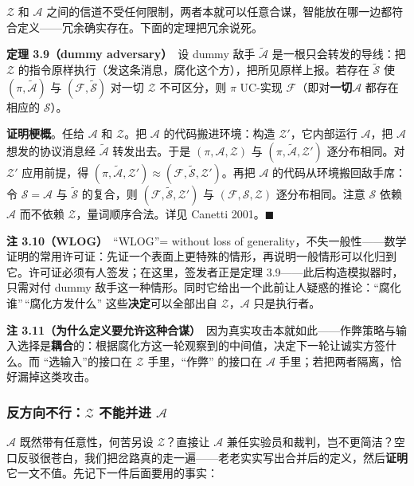 $\mathcal{Z}$ 和 $\mathcal{A}$ 之间的信道不受任何限制，两者本就可以任意合谋，智能放在哪一边都符合定义------冗余确实存在。下面的定理把冗余说死。

\textbf{定理 3.9（dummy adversary）}　设 dummy
敌手 $\tilde{\mathcal{A}}$ 是一根只会转发的导线：把 $\mathcal{Z}$ 的指令原样执行（发这条消息，腐化这个方），把所见原样上报。若存在 $\tilde{\mathcal{S}}$ 使 $(\pi, \tilde{\mathcal{A}})$ 与 $(\mathcal{F}, \tilde{\mathcal{S}})$ 对一切 $\mathcal{Z}$ 不可区分，则 $\pi$ UC-实现 $\mathcal{F}$（即对\textbf{一切}$\mathcal{A}$ 都存在相应的 $\mathcal{S}$）。

\textbf{证明梗概}。任给 $\mathcal{A}$ 和 $\mathcal{Z}$。把 $\mathcal{A}$ 的代码搬进环境：构造 $\mathcal{Z}'$，它内部运行 $\mathcal{A}$，把 $\mathcal{A}$ 想发的协议消息经 $\tilde{\mathcal{A}}$ 转发出去。于是 $(\pi, \mathcal{A}, \mathcal{Z})$ 与 $(\pi, \tilde{\mathcal{A}}, \mathcal{Z}')$ 逐分布相同。对 $\mathcal{Z}'$ 应用前提，得 $(\pi, \tilde{\mathcal{A}}, \mathcal{Z}') \approx (\mathcal{F}, \tilde{\mathcal{S}}, \mathcal{Z}')$。再把 $\mathcal{A}$ 的代码从环境搬回敌手席：令 $\mathcal{S} = \mathcal{A}$ 与 $\tilde{\mathcal{S}}$ 的复合，则 $(\mathcal{F}, \tilde{\mathcal{S}}, \mathcal{Z}')$ 与 $(\mathcal{F}, \mathcal{S}, \mathcal{Z})$ 逐分布相同。注意 $\mathcal{S}$ 依赖 $\mathcal{A}$ 而不依赖 $\mathcal{Z}$，量词顺序合法。详见
Canetti 2001。$\blacksquare$

\textbf{注 3.10（WLOG）}　“WLOG”= without loss of
generality，不失一般性------数学证明的常用许可证：先证一个表面上更特殊的情形，再说明一般情形可以化归到它。许可证必须有人签发；在这里，签发者正是定理
3.9------此后构造模拟器时，只需对付 dummy
敌手这一种情形。同时它给出一个此前让人疑惑的推论：“腐化谁”\,“腐化方发什么”
这些\textbf{决定}可以全部出自 $\mathcal{Z}$，$\mathcal{A}$ 只是执行者。

\textbf{注
3.11（为什么定义要允许这种合谋）}　因为真实攻击本就如此------作弊策略与输入选择是\textbf{耦合}的：根据腐化方这一轮观察到的中间值，决定下一轮让诚实方签什么。而
“选输入”的接口在 $\mathcal{Z}$ 手里，“作弊”
的接口在 $\mathcal{A}$ 手里；若把两者隔离，恰好漏掉这类攻击。

\subsubsection{\texorpdfstring{反方向不行：$\mathcal{Z}$ 不能并进 $\mathcal{A}$}{反方向不行：\textbackslash mathcal\{Z\}不能并进\textbackslash mathcal\{A\}}}

$\mathcal{A}$ 既然带有任意性，何苦另设 $\mathcal{Z}$？直接让 $\mathcal{A}$ 兼任实验员和裁判，岂不更简洁？空口反驳很苍白，我们把岔路真的走一遍------老老实实写出合并后的定义，然后\textbf{证明}它一文不值。先记下一件后面要用的事实：

